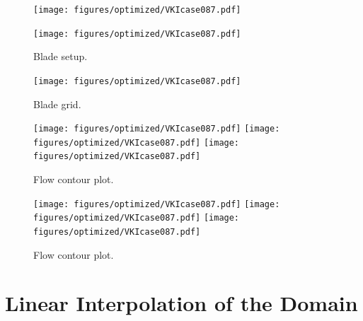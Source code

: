 \begin{figure}[!ht]
    \centering
    \hspace*{-1.5cm}
    \begin{minipage}{0.5\textwidth}
        \texttt{[image: figures/optimized/VKIcase087.pdf]}
    \end{minipage}
    \begin{minipage}{0.5\textwidth}
        \texttt{[image: figures/optimized/VKIcase087.pdf]}
    \end{minipage}
    \caption{Blade setup.}
\end{figure}
\vspace*{-0.5cm}
\begin{figure}[!ht]
    \centering
    \hspace{2.5cm}
    \texttt{[image: figures/optimized/VKIcase087.pdf]}
    \caption{Blade grid.}
    \label{fig:opt3}
\end{figure}

\begin{figure}[!ht]
    \hspace*{-2.0cm}
    \begin{minipage}{0.5\textwidth}
        \texttt{[image: figures/optimized/VKIcase087.pdf]}
        \texttt{[image: figures/optimized/VKIcase087.pdf]}
        \texttt{[image: figures/optimized/VKIcase087.pdf]}
        \caption{Flow contour plot.}
        \label{fig:opt4}
    \end{minipage}
    \hfill
    \begin{minipage}{0.5\textwidth}
        \texttt{[image: figures/optimized/VKIcase087.pdf]}
        \texttt{[image: figures/optimized/VKIcase087.pdf]}
        \texttt{[image: figures/optimized/VKIcase087.pdf]}
        \caption{Flow contour plot.}
        \label{fig:opt5}
    \end{minipage}
\end{figure}


\clearpage

\section{Linear Interpolation of the Domain}
\label{sec:linSec}


